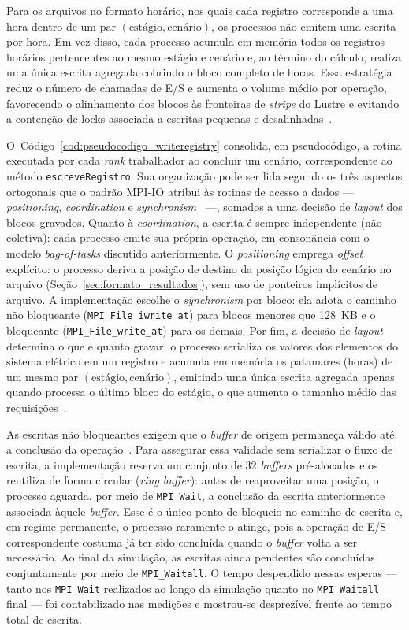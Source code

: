 Para os arquivos no formato horário, nos quais cada registro corresponde a uma
hora dentro de um par $(\text{estágio}, \text{cenário})$, os processos não
emitem uma escrita por hora. Em vez disso, cada processo acumula em memória
todos os registros horários pertencentes ao mesmo estágio e cenário e, ao
término do cálculo, realiza uma única escrita agregada cobrindo o bloco
completo de horas. Essa estratégia reduz o número de chamadas de E/S e
aumenta o volume médio por operação, favorecendo o alinhamento dos blocos
às fronteiras de \textit{stripe} do Lustre e evitando a contenção de locks
associada a escritas pequenas e desalinhadas~\cite{LiaoIPDPS:07}.

O~Código~\ref{cod:pseudocodigo_writeregistry} consolida, em pseudocódigo, a
rotina executada por cada \textit{rank} trabalhador ao concluir um cenário,
correspondente ao método \texttt{escreveRegistro}. Sua organização pode ser
lida segundo os três aspectos
ortogonais que o padrão MPI-IO atribui às rotinas de acesso a dados ---
\textit{positioning}, \textit{coordination} e
\textit{synchronism}~\cite{mpiCite,Rr:10} ---, somados a uma decisão de
\textit{layout} dos blocos gravados. Quanto à \textit{coordination}, a
escrita é sempre independente (não coletiva): cada processo emite sua própria
operação, em consonância com o modelo \textit{bag-of-tasks} discutido
anteriormente. O \textit{positioning} emprega \textit{offset} explícito:
o processo deriva a posição de destino da posição lógica do cenário no
arquivo (Seção~\ref{sec:formato_resultados}), sem uso de ponteiros
implícitos de arquivo. A implementação escolhe o \textit{synchronism} por bloco: ela adota o
caminho não bloqueante (\texttt{MPI\_File\_iwrite\_at}) para blocos menores
que 128~KB e o bloqueante (\texttt{MPI\_File\_write\_at}) para os demais.
Por fim, a decisão de \textit{layout} determina o que e quanto gravar: o
processo serializa os valores dos elementos do sistema elétrico em um
registro e acumula em memória os patamares (horas) de um mesmo par
$(\text{estágio}, \text{cenário})$, emitindo uma única escrita agregada
apenas quando processa o último bloco do estágio, o que aumenta o tamanho
médio das requisições~\cite{Wre:99}.

As escritas não bloqueantes exigem que o \textit{buffer} de origem permaneça
válido até a conclusão da operação~\cite{mpiCite,Wea:99}. Para assegurar
essa validade sem serializar o fluxo de escrita, a implementação reserva um
conjunto de 32 \textit{buffers} pré-alocados e os reutiliza de forma
circular (\textit{ring buffer}): antes de reaproveitar uma posição, o
processo aguarda, por meio de \texttt{MPI\_Wait}, a conclusão da escrita
anteriormente associada àquele \textit{buffer}. Esse é o único ponto de
bloqueio no caminho de escrita e, em regime permanente, o processo
raramente o atinge, pois a operação de E/S correspondente costuma já ter
sido concluída quando o \textit{buffer} volta a ser necessário. Ao final da
simulação, as escritas ainda pendentes são concluídas conjuntamente por
meio de \texttt{MPI\_Waitall}. O tempo despendido nessas esperas --- tanto
nos \texttt{MPI\_Wait} realizados ao longo da simulação quanto no
\texttt{MPI\_Waitall} final --- foi contabilizado nas medições e mostrou-se
desprezível frente ao tempo total de escrita.

